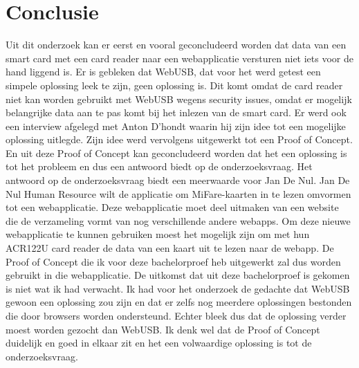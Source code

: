 
\chapter{Conclusie}%
\label{ch:conclusie}


Uit dit onderzoek kan er eerst en vooral geconcludeerd worden dat data van een smart card met een card reader naar een webapplicatie versturen niet iets voor de hand liggend is. Er is gebleken dat WebUSB, dat voor het werd getest een simpele oplossing leek te zijn, geen oplossing is. Dit komt omdat de card reader niet kan worden gebruikt met WebUSB wegens security issues, omdat er mogelijk belangrijke data aan te pas komt bij het inlezen van de smart card.
Er werd ook een interview afgelegd met Anton D'hondt waarin hij zijn idee tot een mogelijke oplossing uitlegde. Zijn idee werd vervolgens uitgewerkt tot een Proof of Concept. En uit deze Proof of Concept kan geconcludeerd worden dat het een oplossing is tot het probleem en dus een antwoord biedt op de onderzoeksvraag.
Het antwoord op de onderzoeksvraag biedt een meerwaarde voor Jan De Nul. Jan De Nul Human Resource wilt de applicatie om MiFare-kaarten in te lezen omvormen tot een webapplicatie. Deze webapplicatie moet deel uitmaken van een website die de verzameling vormt van nog verschillende andere webapps. Om deze nieuwe webapplicatie te kunnen gebruiken moest het mogelijk zijn om met hun ACR122U card reader de data van een kaart uit te lezen naar de webapp. De Proof of Concept die ik voor deze bachelorproef heb uitgewerkt zal dus worden gebruikt in die webapplicatie.
De uitkomst dat uit deze bachelorproef is gekomen is niet wat ik had verwacht. Ik had voor het onderzoek de gedachte dat WebUSB gewoon een oplossing zou zijn en dat er zelfs nog meerdere oplossingen bestonden die door browsers worden ondersteund. Echter bleek dus dat de oplossing verder moest worden gezocht dan WebUSB. Ik denk wel dat de Proof of Concept duidelijk en goed in elkaar zit en het een volwaardige oplossing is tot de onderzoeksvraag.

